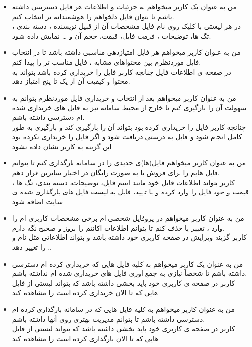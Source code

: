 \documentclass{article}
\begin{document}
\begin{itemize}
	\item من به عنوان یک کاربر میخواهم به جزئیات و اطلاعات هر فایل دسترسی داشته باشم تا بتوان فایل دلخواهم را هوشمندانه تر انتخاب کنم.
	\\
در هر لیستی با کلیک روی نام فایل مشخصات آن از قبیل نویسنده ، دسته بندی ، تگ ها، توضیحات ، فرمت فایل، قیمت، حجم آن و … نمایش داده شود.
	
	\item من به عنوان کاربر میخواهم هر فایل امتیازدهی مناسبی داشته باشد تا در انتخاب فایل موردنظرم بین محتواهای مشابه ، فایل مناسب تر را پیدا کنم.
	\\
در صفحه ی اطلاعات فایل چنانچه کاربر فایل را خریداری کرده باشد بتواند به محتوا و کیفیت آن از یک تا پنج امتیاز دهد.

	\item من به عنوان کاربر میخواهم بعد از انتخاب و خریداری فایل موردنظرم بتوانم به سهولت آن را بارگیری کنم تا خارج از محیط سامانه نیز به فایل های خریداری شده ام دسترسی داشته باشم.
	\\
چنانچه کاربر فایل را خریداری کرده بود بتواند آن را بارگیری کند و بارگیری به طور کامل انجام شود و فایل به درستی دریافت شود و اگر فایل را خریداری نکرده بود این گزینه به کاربر نشان داده نشود

	\item من به عنوان کاربر میخواهم فایل(ها)ی جدیدی را در سامانه بارگذاری کنم تا بتوانم فایل هایم را برای فروش یا به صورت رایگان در اختیار سایرین قرار دهم.
	\\
کاربر بتواند اطلاعات فایل خود مانند اسم فایل، توضیحات، دسته بندی، تگ ها ، قیمت و خود فایل را وارد کرده و با تایید، فایل به لیست فایل های بارگذاری شده ی سایت اضافه شود

	\item من به عنوان کاربر میخواهم در پروفایل شخصی ام برخی مشخصات کاربری ام را وارد ، تغییر یا حذف کنم تا بتوانم اطلاعات اکانتم را بروز و صحیح نگه دارم. 
	\\
کاربر گزینه ویرایش در صفحه کاربری خود داشته باشد و بتواند اطلاعاتی مثل نام و .. را تغییر دهد

	\item من به عنوان یک کاربر میخواهم به کلیه فایل هایی که خریداری کرده ام دسترسی داشته باشم تا شخصاً نیازی به جمع آوری فایل های خریداری شده ام نداشته باشم.
	\\
کاربر در صفحه ی کاربری خود باید بخشی داشته باشد که بتواند لیستی از فایل هایی که تا الان خریداری کرده است را مشاهده کند

	\item من به عنوان کاربر میخواهم به کلیه فایل هایی که در سامانه بارگذاری کرده ام دسترسی داشته باشم تا بتوانم مدیریت بهتری روی آنها داشته باشم.
	\\
کاربر در صفحه ی کاربری خود باید بخشی داشته باشد که بتواند لیستی از فایل هایی که تا الان بارگذاری کرده است را مشاهده کند


\end{itemize}
\end{document}
